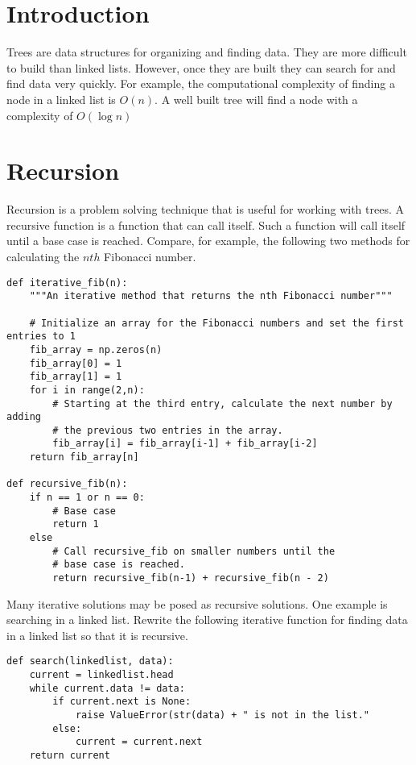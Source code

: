 \label{lab:Python_Datastructures2}


\section*{Introduction}

Trees are data structures for organizing and finding data.
They are more difficult to build than linked lists.
However, once they are built they can search for and find data very quickly.
For example, the computational complexity of finding a node in a linked list is $O(n)$.
A well built tree will find a node with a complexity of $O(\log{n})$

\section*{Recursion}

Recursion is a problem solving technique that is useful for working with trees.
A recursive function is a function that can call itself.
Such a function will call itself until a base case is reached.
Compare, for example, the following two methods for calculating the $nth$ Fibonacci number.

\begin{lstlisting}
def iterative_fib(n):
	"""An iterative method that returns the nth Fibonacci number"""

	# Initialize an array for the Fibonacci numbers and set the first entries to 1
	fib_array = np.zeros(n)
	fib_array[0] = 1
	fib_array[1] = 1
	for i in range(2,n):
		# Starting at the third entry, calculate the next number by adding
		# the previous two entries in the array. 
		fib_array[i] = fib_array[i-1] + fib_array[i-2]
	return fib_array[n]

def recursive_fib(n):
	if n == 1 or n == 0:
		# Base case
		return 1
	else
		# Call recursive_fib on smaller numbers until the 
		# base case is reached.
		return recursive_fib(n-1) + recursive_fib(n - 2)
\end{lstlisting}

\begin{problem}
Many iterative solutions may be posed as recursive solutions.
One example is searching in a linked list.
Rewrite the following iterative function for finding data in a linked list so that it is recursive.
\begin{lstlisting}
def search(linkedlist, data):
	current = linkedlist.head
	while current.data != data:
		if current.next is None:
			raise ValueError(str(data) + " is not in the list."
		else:
			current = current.next
	return current
\end{lstlisting}
\end{problem}


